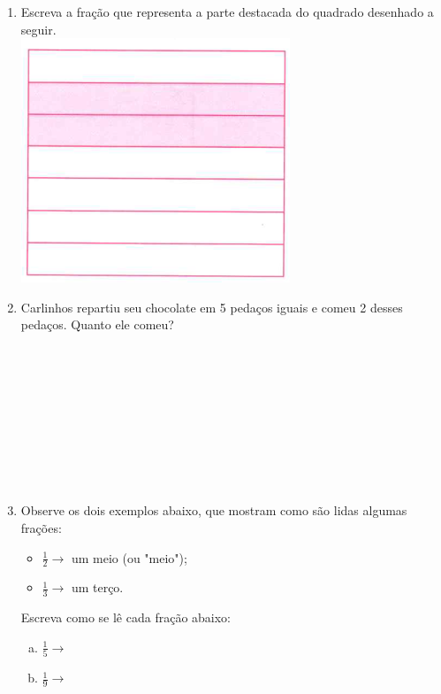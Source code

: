\documentclass[a4paper,14pt]{article}
\begin{document}
\begin{multicols}{2}
\begin{enumerate}
			\item Escreva a fração que representa a parte destacada do quadrado desenhado a seguir. \\
			\includegraphics[width=1\linewidth]{6FMA07_imagens/imagem03} \\
			\item Carlinhos repartiu seu chocolate em 5 pedaços iguais e comeu 2 desses pedaços. Quanto ele comeu? \\\\\\\\\\\\\\\\\\\\
			\item Observe os dois exemplos abaixo, que mostram como são lidas algumas frações:
			\begin{itemize}
				\item $\frac{1}{2} \longrightarrow$	um meio (ou "meio");
				\item $\frac{1}{3} \longrightarrow$ um terço.
			\end{itemize}
			Escreva como se lê cada fração abaixo:
			\begin{enumerate}[a)]
				\item $\frac{1}{5} \longrightarrow$
				\item $\frac{1}{9} \longrightarrow$

\end{enumerate}
\end{enumerate}
\end{multicols}
\end{document}
